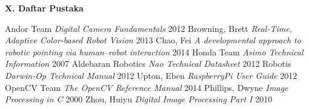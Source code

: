 \documentclass[a4paper,12pt]{article}
\begin{document}
\vspace{10pt}
\noindent \textbf{X. \hspace{9pt} Daftar Pustaka} 

\begingroup
  \renewcommand{\section}[2]{}%
    \begin{thebibliography}{}
	 Andor Team \textit{Digital Camera Fundamentals} 2012
	 Browning, Brett \textit{Real-Time, Adaptive Color-based Robot Vision} 2013
	 Chao, Fei \textit{A developmental approach to robotic pointing via human–robot interaction} 2014
	 Honda Team \textit{Asimo Technical Information} 2007
	 Aldebaran Robotics \textit{Nao Technical Datasheet} 2012
	 Robotis \textit{Darwin-Op Technical Manual} 2012
	 Upton, Eben \textit{RaspberryPi User Guide} 2012
	 OpenCV Team \textit{The OpenCV Reference Manual} 2014
	 Phillips, Dwyne \textit{Image Processing in C} 2000
	 Zhou, Huiyu \textit{Digital Image Processing Part I} 2010
    \end{thebibliography}
\endgroup
\end{document}
